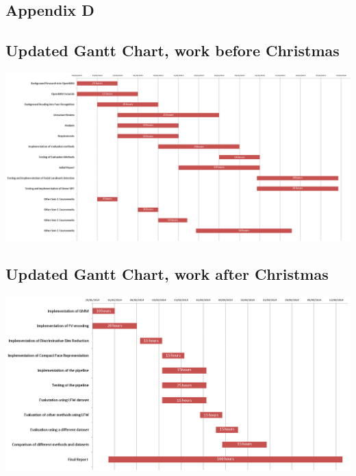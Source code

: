 \documentclass[12pt, a4paper]{article}
\begin{document}
\begin{appendices}
\section{Appendix D}
\subsection{Updated Gantt Chart, work before Christmas}
\includegraphics[scale=0.3, angle=90]{images/newganttprexmas.png}
\subsection{Updated Gantt Chart, work after Christmas}
\includegraphics[scale=0.4, angle=90]{images/newganttpostxmas.png}

        \end{appendices}       
       
       
        \newpage
 
        

\end{document}
